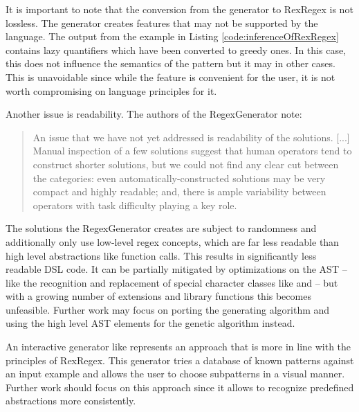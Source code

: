 It is important to note that the conversion from the generator to RexRegex is not lossless. The generator creates features that may not be supported by the language. The output from the example in Listing \ref{code:inferenceOfRexRegex} contains lazy quantifiers which have been converted to greedy ones. In this case, this does not influence the semantics of the pattern but it may in other cases. This is unavoidable since while the feature is convenient for the user, it is not worth compromising on language principles for it.

Another issue is readability. The authors of the RegexGenerator note: 

{\small
\begin{quote}
An issue that we have not yet addressed is readability of the solutions. [...] Manual inspection of a few solutions suggest that human operators tend to construct shorter solutions, but we could not find any clear cut between the categories: even automatically-constructed solutions may be very compact and highly readable; and, there is ample variability between operators with task difficulty playing a key role. \cite{bartoli2016can}
\end{quote}
}

The solutions the RegexGenerator creates are subject to randomness and additionally only use low-level regex concepts, which are far less readable than high level abstractions like function calls. This results in significantly less readable DSL code. It can be partially mitigated by optimizations on the AST -- like the recognition and replacement of special character classes like  and  -- but with a growing number of extensions and library functions this becomes unfeasible. Further work may focus on porting the generating algorithm and using the high level AST elements for the genetic algorithm instead.

An interactive generator like \cite{noxoneRegexGenerator} represents an approach that is more in line with the principles of RexRegex. This generator tries a database of known patterns against an input example and allows the user to choose subpatterns in a visual manner. Further work should focus on this approach since it allows to recognize predefined abstractions more consistently.




